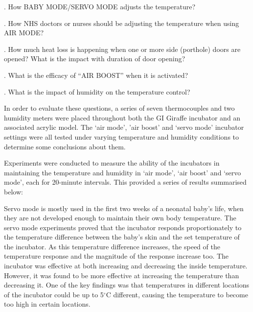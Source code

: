 \documentclass{article}
\begin{document}
\vspace{3mm}

. How BABY MODE/SERVO MODE adjusts the temperature? 

\vspace{2mm}

. How NHS doctors or nurses should be adjusting the temperature when using AIR MODE?

\vspace{2mm}

. How much heat loss is happening when one or more side (porthole) doors are opened? What is the impact with duration of door opening? 

\vspace{2mm}

. What is the efficacy of “AIR BOOST” when it is activated?

\vspace{2mm}

. What is the impact of humidity on the temperature control? 

 \vspace{3mm}

In order to evaluate these questions, a series of seven thermocouples and two humidity meters were placed throughout both the GI Giraffe incubator and an associated acrylic model. The ‘air mode’, ’air boost’ and ‘servo mode' incubator settings were all tested under varying temperature and humidity conditions to determine some conclusions about them. 

 \vspace{3mm}

Experiments were conducted to measure the ability of the incubators in maintaining the temperature and humidity in ‘air mode’, ‘air boost’ and ‘servo mode', each for 20-minute intervals. This provided a series of results summarised below: 

\vspace{3mm} 

Servo mode is mostly used in the first two weeks of a neonatal baby's life, when they are not developed enough to maintain their own body temperature. The servo mode experiments proved that the incubator responds proportionately to the temperature difference between the baby’s skin and the set temperature of the incubator. As this temperature difference increases, the speed of the temperature response and the magnitude of the response increase too. The incubator was effective at both increasing and decreasing the inside temperature. However, it was found to be more effective at increasing the temperature than decreasing it. One of the key findings was that temperatures in different locations of the incubator could be up to 5$^{\circ}$C different, causing the temperature to become too high in certain locations. 
\end{document}
